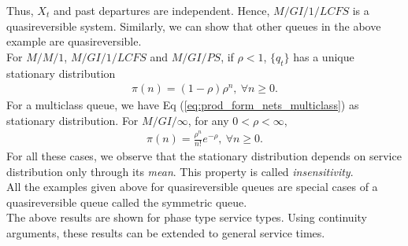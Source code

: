 \documentclass[all-lectures.tex]{subfiles}
\begin{document}
Thus, $X_t$ and past departures are independent. Hence, $M/GI/1/LCFS$ is a quasireversible system. Similarly, we can show that other queues in the above example are quasireversible. \\
\indent For $M/M/1$, $M/GI/1/LCFS$ and $M/GI/PS$, if $\rho < 1$, $\{q_t\}$ has a unique stationary distribution 
\begin{align*}
\pi(n) = (1-\rho)\rho^n,\ \forall n \geq 0.
\end{align*}
For a multiclass queue, we have Eq (\ref{eq:prod_form_nets_multiclass}) as stationary distribution.
For $M/GI/\infty$, for any $0<\rho<\infty$,
\begin{align*}
\pi(n) = \frac{\rho^n}{n!} e^{-\rho}, \ \forall  n \geq 0.
\end{align*}
For all these cases, we observe that the stationary distribution depends on service distribution only through its \textit{mean}. This property is called \textit{insensitivity}.\\
\indent All the examples given above for quasireversible queues are special cases of a quasireversible queue called the symmetric queue. \\
\indent The above results are shown for phase type service types. Using continuity arguments, these results can be extended to general service times. 
\end{document}
